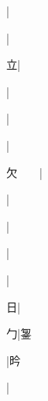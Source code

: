\begin{multicols}{2}
{{\cjk{}{\cnsym{}　}{\cnsym{}　}{\cnsym{}　}}|{}\par
{\cjk{}{\cnsym{}　}{\cnsym{}　}{\cnsym{}　}}|{}\par
{\cjk{}{\cnsym{}　}{\cnsym{}　}立}|{}\par
{\cjk{}{\cnsym{}　}{\cnsym{}　}{\cnsym{}　}}|{}\par
{\cjk{}{\cnsym{}　}{\cnsym{}　}{\cnsym{}　}}|{}\par
{}|{}\par
{\cjk{}欠{\cnsym{}　}{\cnsym{}　}}|{}\par
{\cjk{}{\cnsym{}　}{\cnsym{}　}{\cnsym{}　}}|{}\par
{\cjk{}{\cnsym{}　}{\cnsym{}　}{\cnsym{}　}}|{}\par
{\cjk{}{\cnsym{}　}{\cnsym{}　}{\cnsym{}　}}|{}\par
{\cjk{}{\cnsym{}　}{\cnsym{}　}{\cnsym{}　}}|{}\par
{日}|{}\par
{\cjk{}{\cnsym{}　}{\cnsym{}　}勹}|{\cjk{}銞}\par
{\cjk{}{\cnsym{}　}{\cnsym{}　}{\cnsym{}　}}|{\cjk{}昑}\par
{}|{}\par
}
\end{multicols}
